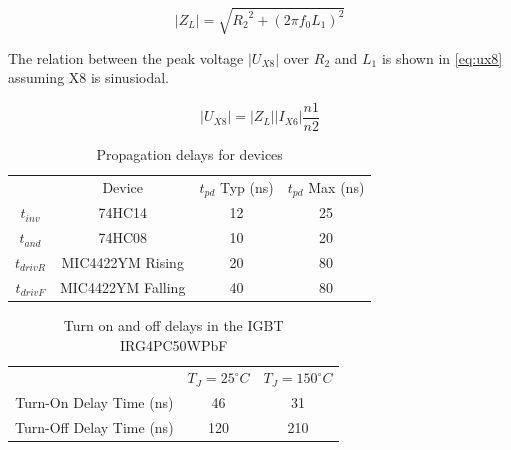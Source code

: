 \begin{equation} \label{eq:zl}
    |Z_{L}| = \sqrt{{R_2}^2 + (2 \pi f_0 L_1)^2}
\end{equation}

The relation between the peak voltage $|U_{X8}|$ over $R_2$ and $L_1$ is shown in \cref{eq:ux8} assuming X8 is sinusiodal.

\begin{equation} \label{eq:ux8}
    |U_{X8}| = |Z_L| |I_{X6}| \frac{n1}{n2}
\end{equation}



\begin{table}[]
    \centering
    \begin{tabular}{c|c|c|c}
                &   Device              & $t_{pd}$ Typ (ns)   & $t_{pd}$ Max (ns) \\
        $t_{inv}$ &   74HC14              & 12            & 25\\
        $t_{and}$ &   74HC08              & 10            & 20\\
        $t_{driv R}$& MIC4422YM Rising    & 20            & 80\\
        $t_{driv F}$& MIC4422YM Falling   & 40            & 80
    \end{tabular}
    \caption{Propagation delays for devices}
    \label{tab:tpd}
\end{table}

\begin{table}[]
    \centering
    \begin{tabular}{c|c|c}
                            & $T_J = 25 ^{\circ}C$ & $T_J = 150 ^{\circ}C$ \\
        Turn-On Delay Time (ns)  & 46                & 31    \\
        Turn-Off Delay Time (ns) & 120               & 210
    \end{tabular}
    \caption{Turn on and off delays in the IGBT IRG4PC50WPbF}
    \label{tab:tigbt}
\end{table}

